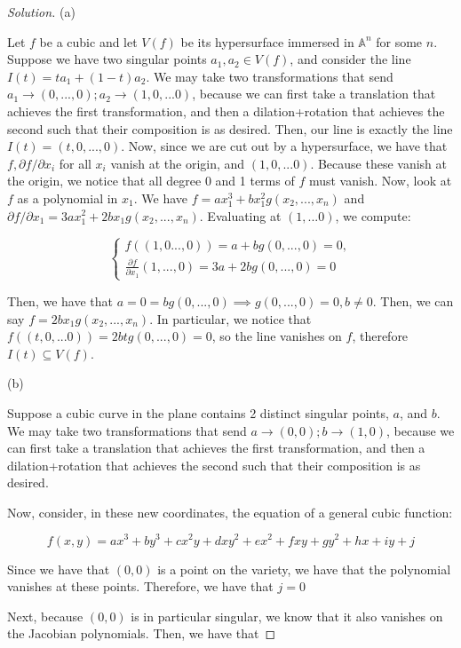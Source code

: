 \documentclass[10pt]{article}
\begin{document}
\begin{proof}[Solution]
(a)

Let $f$ be a cubic and let $V(f)$ be its hypersurface immersed in $\mathbb{A}^n$ for some $n$. Suppose we have two singular points $a_1, a_2 \in V(f)$, and consider the line $I(t) = ta_1 + (1-t)a_2$. We may take two transformations that send $a_1 \to (0,...,0); a_2 \to (1,0,...0)$, because we can first take a translation that achieves the first transformation, and then a dilation+rotation that achieves the second such that their composition is as desired. Then, our line is exactly the line $I(t) = (t,0,...,0)$. Now, since we are cut out by a hypersurface, we have that $f,\partial f/\partial x_i$ for all $x_i$ vanish at the origin, and $(1,0,...0)$. Because these vanish at the origin, we notice that all degree 0 and 1 terms of $f$ must vanish. Now, look at $f$ as a polynomial in $x_1$. We have $f = ax_1^3 + bx_1^2 g(x_2,...,x_n)$ and $\partial f / \partial x_1 = 3ax_1^2 + 2bx_1 g(x_2,...,x_n)$. Evaluating at $(1,...0)$, we compute:

$$ \begin{cases}f((1,0...,0)) = a + b g(0,...,0) = 0, \\ \frac{\partial f}{\partial x_1}(1,...,0) = 3a + 2b g(0,...,0) = 0 \end{cases}$$

Then, we have that $a = 0 = bg(0,...,0) \implies g(0,...,0) = 0, b \not = 0$. Then, we can say $f =  2bx_1 g(x_2,...,x_n)$. In particular, we notice that $f((t,0,...0)) = 2btg(0,...,0) = 0$, so the line vanishes on $f$, therefore $I(t) \subseteq V(f)$.



(b)

Suppose a cubic curve in the plane contains 2 distinct singular points, $a$, and $b$. We may take two transformations that send $a \to (0,0); b \to (1,0)$, because we can first take a translation that achieves the first transformation, and then a dilation+rotation that achieves the second such that their composition is as desired.

Now, consider, in these new coordinates, the equation of a general cubic function:

$$f(x,y) = ax^3 + by^3 + cx^2y + dxy^2 + ex^2 + fxy + gy^2 + hx + iy + j$$

Since we have that $(0,0)$ is a point on the variety, we have that the polynomial vanishes at these points. Therefore, we have that $j=0$

Next, because $(0,0)$ is in particular singular, we know that it also vanishes on the Jacobian polynomials. Then, we have that


\end{proof}
\end{document}
